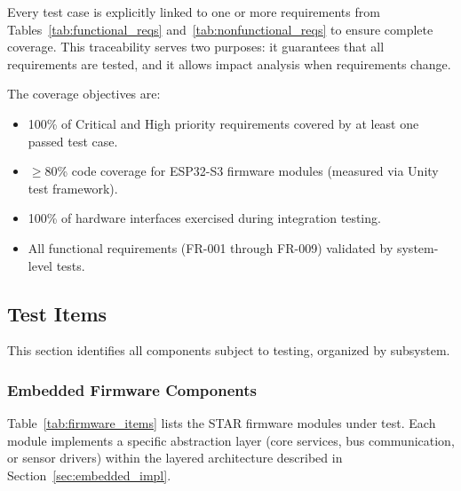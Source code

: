 Every test case is explicitly linked to one or more requirements from Tables~\ref{tab:functional_reqs} and~\ref{tab:nonfunctional_reqs} to ensure complete coverage. This traceability serves two purposes: it guarantees that all requirements are tested, and it allows impact analysis when requirements change.

The coverage objectives are:
\begin{itemize}
    \item 100\% of Critical and High priority requirements covered by at least one passed test case.
    \item $\geq$80\% code coverage for ESP32-S3 firmware modules (measured via Unity test framework).
    \item 100\% of hardware interfaces exercised during integration testing.
    \item All functional requirements (FR-001 through FR-009) validated by system-level tests.
\end{itemize}

\subsection{Test Items}

This section identifies all components subject to testing, organized by subsystem.

\subsubsection{Embedded Firmware Components}

Table~\ref{tab:firmware_items} lists the STAR firmware modules under test. Each module implements a specific abstraction layer (core services, bus communication, or sensor drivers) within the layered architecture described in Section~\ref{sec:embedded_impl}.

